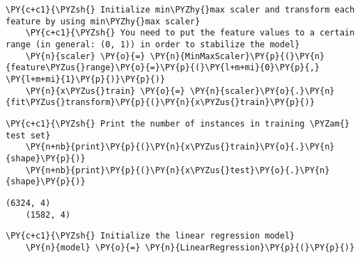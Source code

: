         \begin{tcolorbox}[breakable, size=fbox, boxrule=1pt, pad at break*=1mm,colback=cellbackground, colframe=cellborder]
    \begin{Verbatim}[commandchars=\\\{\}]
    \PY{c+c1}{\PYZsh{} Initialize min\PYZhy{}max scaler and transform each feature by using min\PYZhy{}max scaler}
    \PY{c+c1}{\PYZsh{} You need to put the feature values to a certain range (in general: (0, 1)) in order to stabilize the model}
    \PY{n}{scaler} \PY{o}{=} \PY{n}{MinMaxScaler}\PY{p}{(}\PY{n}{feature\PYZus{}range}\PY{o}{=}\PY{p}{(}\PY{l+m+mi}{0}\PY{p}{,} \PY{l+m+mi}{1}\PY{p}{)}\PY{p}{)}
    \PY{n}{x\PYZus{}train} \PY{o}{=} \PY{n}{scaler}\PY{o}{.}\PY{n}{fit\PYZus{}transform}\PY{p}{(}\PY{n}{x\PYZus{}train}\PY{p}{)}
    \end{Verbatim}
    \end{tcolorbox}
    
        \begin{tcolorbox}[breakable, size=fbox, boxrule=1pt, pad at break*=1mm,colback=cellbackground, colframe=cellborder]
    \begin{Verbatim}[commandchars=\\\{\}]
    \PY{c+c1}{\PYZsh{} Print the number of instances in training \PYZam{} test set}
    \PY{n+nb}{print}\PY{p}{(}\PY{n}{x\PYZus{}train}\PY{o}{.}\PY{n}{shape}\PY{p}{)}
    \PY{n+nb}{print}\PY{p}{(}\PY{n}{x\PYZus{}test}\PY{o}{.}\PY{n}{shape}\PY{p}{)}
    \end{Verbatim}
    \end{tcolorbox}
    
        \begin{Verbatim}[commandchars=\\\{\}]
    (6324, 4)
    (1582, 4)
        \end{Verbatim}
    
        \begin{tcolorbox}[breakable, size=fbox, boxrule=1pt, pad at break*=1mm,colback=cellbackground, colframe=cellborder]
    \begin{Verbatim}[commandchars=\\\{\}]
    \PY{c+c1}{\PYZsh{} Initialize the linear regression model}
    \PY{n}{model} \PY{o}{=} \PY{n}{LinearRegression}\PY{p}{(}\PY{p}{)}
    \end{Verbatim}
    \end{tcolorbox}
    
